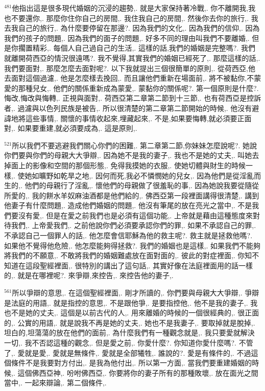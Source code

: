 \documentclass{book}
\begin{document}
$^{481}$他指出這是很多現代婚姻的沉浸的趨勢,.
就是大家保持著冷戰,.
你不離開我,我也不要還你,.
那麼你住你自己的房間,.
我住我自己的房間,.
然後你去你的旅行,.
我去我自己的旅行,.
為什麼要停留在那邊?.
因為我們的文化,.
因為我們的信仰,.
因為我們的孩子的問題,.
因為我們的面子的問題,.
好多不同的理由叫我們不要離婚,.
但是你擱置精彩,.
每個人自己過自己的生活,.
這樣的話,我們的婚姻是完整嗎?.
我們就離開荷西亞的情況很遠嗎?.
我不覺得,其實我們的婚姻已經死了,.
那麼這樣的話,.
我們要面對,.
那麼怎麼去面對呢?.
以下我就提出三個很簡單的原則,.
從荷西亞,他去面對這個過濾,.
他是怎麼樣去挽回,.
而且讓他們重新在場面前,.
將不被黏你,不蒙愛的那種兒女,.
他們的關係重新成為蒙愛,.
蒙黏你的關係呢?.
第一個原則是什麼?.
悔改,悔改與悔轉,.
正視與面對,.
荷西亞第二章第二節到十三節,.
也有荷西亞是控訴者,.
過濾與以色列民族是被告,.
所以很清楚的第二章第二節開始的時候,.
他沒有避諱地將這些事情,.
關懷的事情收起來,埋藏起來,.
不是,如果要悔轉,就必須要正面對,.
如果要重建,就必須要成為,.
這是原則,.

$^{521}$所以我們不要逃避我們關心你們的困難,.
第二章第二節,你妹妹怎麼說呢?.
她說你們要與你們的母親大大爭辯,.
因為她不是我的妻子,.
我也不是她的丈夫,.
叫她去掉面上的影像和空間的那個形態,.
免得我摸她的衣服,.
使她切體與財生的時候一樣,.
使她如曠野如乾旱之地,.
因何而死,我必不憐憫她的兒女,.
因為他們是從淫亂而生的,.
他們的母親行了淫亂,.
懷他們的母親做了很羞恥的事,.
因為她說我要從隨從所愛的,.
我的餅水羊奴麻油酒都是他們給的,.
佛西亞第一段裡面講得很清楚,.
講到他妻子有什麼問題,.
造成他們婚姻的問題,.
他沒有筆尾的放在亮光之當中,.
不是我們要沒有愛,.
但是在愛之前我們也是必須有這個功能,.
上帝就是藉由這種態度來對待我們,.
上帝愛我們,.
之前他說你們必須要承認你們的罪,.
如果不承認自己的罪,.
不承認自己一個罪人的話,.
他怎麼會信耶穌為他的救主呢?.
救主就是拯救他嗎?.
如果他不覺得他危險,.
他怎麼能夠得拯救?.
我們的婚姻也是這樣,.
如果我們不能夠將我們的不願意,.
不敢將我們的婚姻難處放在面對面的,.
彼此的對症裡面,.
你知不知道在這段聖經裡面,.
很特別的講出了這句話,.
其實好像在法庭裡面用的話一樣的,.
就是在哪裡呢?.
來爭辯,來控告,.
來控告他的妻子,.

$^{561}$所以爭辯的意思,.
在這個聖經裡面,.
剛才所讀的,.
你們要與母親大大爭辯,.
爭辯是法庭的用語,.
就是指控的意思,.
不是跟他爭,.
是要指控他,.
他不是我的妻子,.
我也不是她的丈夫,.
這個是以前古代的人,.
用來離婚的時候的一個很經典的,.
很正面的,.
公實的用語,.
就是說我不再是她的丈夫,.
她也不是我妻子,.
要取掉就是脫掉,.
坦白的,坦蕩蕩的放在他們的面前,.
為什麼我們有一種觀念就是,.
我只要愛就解決一切,.
我不否認這種的觀念,.
但是愛之前,.
你愛什麼?.
你知道你愛什麼嗎?.
不管了,.
愛就是愛,.
愛就是無條件,.
愛就是全部犧牲,.
誰說的?.
愛是有條件的,.
不過這個條件不是我要對方付出,.
是我為他付出,.
所以第一方面,.
當我們要重建婚姻的時候,.
這個佛西亞神,.
吩咐佛西亞,.
你要將你的妻子所有的那種敗壞,.
放在面光之間當中,.
一起來辯論,.
第二個條件,.
\end{document}
